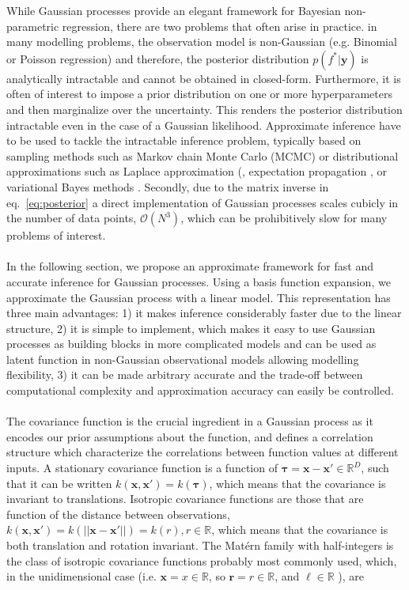\documentclass[]{interact}
\theoremstyle{plain}%
\theoremstyle{definition}
\theoremstyle{remark}
\begin{document}
While Gaussian processes provide an elegant framework for Bayesian non-parametric regression, there are two problems that often arise in practice. 
in many modelling problems, the observation model is non-Gaussian (e.g. Binomial or Poisson regression) and therefore, the posterior distribution $p(f^*| \mathbf{y})$ is analytically intractable and cannot be obtained in closed-form. Furthermore, it is often of interest to impose a prior distribution on one or more hyperparameters and then marginalize over the uncertainty. This renders the posterior distribution intractable even in the case of a Gaussian likelihood. Approximate inference have to be used to tackle the intractable inference problem, typically based on sampling methods such as Markov chain Monte Carlo (MCMC) \citep{brooks_2011} or distributional approximations such as Laplace approximation (\citep{williams1998bayesian,rasmussen2006gaussian}, expectation propagation \citep{minka2001expectation}, or variational Bayes methods \citep{gibbs2000variational,csato2000efficient}. Secondly, due to the matrix inverse in eq.~\eqref{eq:posterior} a direct implementation of Gaussian processes scales cubicly in the number of data points, $\mathcal{O}\left(N^3\right)$,  which can be prohibitively slow for many problems of interest. 
\\
\\
In the following section, we propose an approximate framework for fast and accurate inference for Gaussian processes. Using a basis function expansion, we approximate the Gaussian process with a linear model. This representation has three main advantages: 1) it makes inference considerably faster due to the linear structure, 2) it is simple to implement, which makes it easy to use Gaussian processes as building blocks in more complicated models and can be used as latent function in non-Gaussian observational models allowing modelling flexibility, 3) it can be made arbitrary accurate and the trade-off between computational complexity and approximation accuracy can easily be controlled.
\\
\\
The covariance function is the crucial ingredient in a Gaussian process as it encodes our prior assumptions about the function, and defines a correlation structure which characterize the correlations between function values at different inputs. A stationary covariance function is a function of $\bm{\tau}=\mathbf{x}-\mathbf{x}' \in \mathbb{R}^D$, such that it can be written $k(\mathbf{x},\mathbf{x}') = k(\bm{\tau})$, which means that the covariance is invariant to translations. Isotropic covariance functions are those that are function of the distance between observations, $k(\mathbf{x},\mathbf{x}') = k(||\mathbf{x}-\mathbf{x}'||) = k(r), r\in \mathbb{R}$, which means that the covariance is both translation and rotation invariant. The Mat\'ern family with half-integers is the class of isotropic covariance functions probably most commonly used, which, in the unidimensional case (i.e. $\mathbf{x}=x\in \mathbb{R}$, so $\mathbf{r}=r\in \mathbb{R}$, and $\ell\in \mathbb{R}$ ), are
\end{document}
